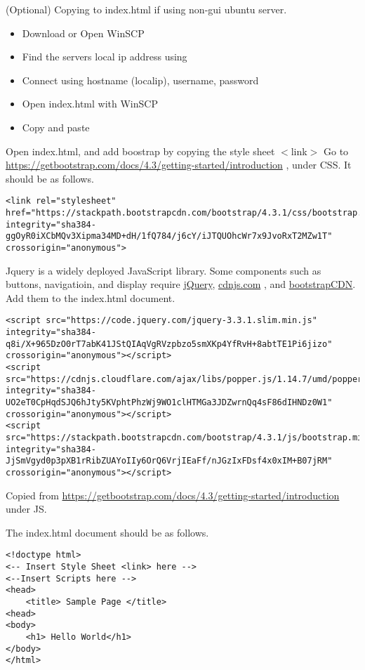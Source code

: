 \documentclass[12pt]{article}
\begin{document}
\begin{todolist}
\item (Optional) Copying to index.html if using non-gui ubuntu server. 
    \begin{itemize}
        \item Download or Open WinSCP
        \item Find the servers local ip address using 
        \item Connect using hostname (localip), username, password
        \item Open index.html with WinSCP
        \item Copy and paste
    \end{itemize}
    \item Open index.html, and add boostrap by copying the style sheet $<$link$>$ Go to \color{red}\href{https://getbootstrap.com/docs/4.3/getting-started/introduction}{https://getbootstrap.com/docs/4.3/getting-started/introduction} \color{black}, under CSS. It should be as follows.  
\begin{lstlisting}
<link rel="stylesheet" href="https://stackpath.bootstrapcdn.com/bootstrap/4.3.1/css/bootstrap.min.css" integrity="sha384-ggOyR0iXCbMQv3Xipma34MD+dH/1fQ784/j6cY/iJTQUOhcWr7x9JvoRxT2MZw1T" crossorigin="anonymous">
\end{lstlisting}
    \item Jquery is a widely deployed JavaScript library. Some components such as buttons, navigatioin, and display require  \color{red}\href{https://jquery.com/}{jQuery}\color{black}, \color{red}\href{https://cdnjs.com/}{cdnjs.com} \color{black}, and \color{red}\href{https://www.bootstrapcdn.com/}{bootstrapCDN}\color{black}. Add them to the index.html document. 
\begin{lstlisting}
<script src="https://code.jquery.com/jquery-3.3.1.slim.min.js" integrity="sha384-q8i/X+965DzO0rT7abK41JStQIAqVgRVzpbzo5smXKp4YfRvH+8abtTE1Pi6jizo" crossorigin="anonymous"></script>
<script src="https://cdnjs.cloudflare.com/ajax/libs/popper.js/1.14.7/umd/popper.min.js" integrity="sha384-UO2eT0CpHqdSJQ6hJty5KVphtPhzWj9WO1clHTMGa3JDZwrnQq4sF86dIHNDz0W1" crossorigin="anonymous"></script>
<script src="https://stackpath.bootstrapcdn.com/bootstrap/4.3.1/js/bootstrap.min.js" integrity="sha384-JjSmVgyd0p3pXB1rRibZUAYoIIy6OrQ6VrjIEaFf/nJGzIxFDsf4x0xIM+B07jRM" crossorigin="anonymous"></script>
\end{lstlisting}
Copied from \color{red}\href{https://getbootstrap.com/docs/4.3/getting-started/introduction/}{https://getbootstrap.com/docs/4.3/getting-started/introduction} \color{black} under JS. 
    \item The index.html document should be as follows.
\begin{lstlisting}
<!doctype html> 
<-- Insert Style Sheet <link> here --> 
<--Insert Scripts here --> 
<head> 
    <title> Sample Page </title> 
<head> 
<body> 
    <h1> Hello World</h1> 
</body> 
</html> 
\end{lstlisting}
\end{todolist}
\end{document}
